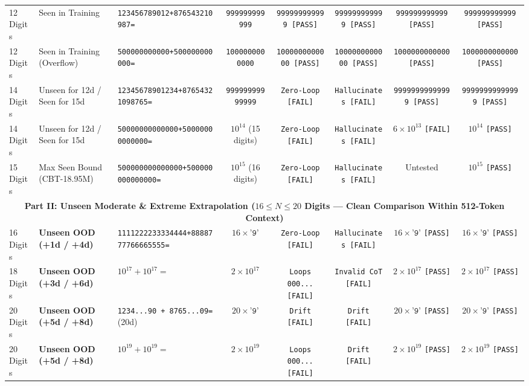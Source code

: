\documentclass[10pt,twocolumn]{article}
\begin{document}
\begin{table}[t]
{\begin{tabular}{@{}lllccccc@{}}
12 Digits & Seen in Training & \texttt{123456789012+876543210987=} & \texttt{999999999999} & \texttt{999999999999 [PASS]} & \texttt{999999999999 [PASS]} & \texttt{999999999999 [PASS]} & \texttt{999999999999 [PASS]} \\
12 Digits & Seen in Training (Overflow) & \texttt{500000000000+500000000000=} & \texttt{1000000000000} & \texttt{1000000000000 [PASS]} & \texttt{1000000000000 [PASS]} & \texttt{1000000000000 [PASS]} & \texttt{1000000000000 [PASS]} \\
14 Digits & Unseen for 12d / Seen for 15d & \texttt{12345678901234+87654321098765=} & \texttt{99999999999999} & \texttt{Zero-Loop [FAIL]} & \texttt{Hallucinates [FAIL]} & \texttt{99999999999999 [PASS]} & \texttt{99999999999999 [PASS]} \\
14 Digits & Unseen for 12d / Seen for 15d & \texttt{50000000000000+50000000000000=} & $10^{14}$ (15 digits) & \texttt{Zero-Loop [FAIL]} & \texttt{Hallucinates [FAIL]} & $6\times 10^{13}$ \texttt{[FAIL]} & $10^{14}$ \texttt{[PASS]} \\
15 Digits & Max Seen Bound (CBT-18.95M) & \texttt{500000000000000+500000000000000=} & $10^{15}$ (16 digits) & \texttt{Zero-Loop [FAIL]} & \texttt{Hallucinates [FAIL]} & Untested & $10^{15}$ \texttt{[PASS]} \\
\midrule
\multicolumn{8}{c}{\textbf{Part II: Unseen Moderate \& Extreme Extrapolation ($16 \le N \le 20$ Digits --- Clean Comparison Within 512-Token Context)}} \\
\midrule
16 Digits & \textbf{Unseen OOD (+1d / +4d)} & \texttt{1111222233334444+8888777766665555=} & $16\times\texttt{'9'}$ & \texttt{Zero-Loop [FAIL]} & \texttt{Hallucinates [FAIL]} & $16\times\texttt{'9'}$ \texttt{[PASS]} & $16\times\texttt{'9'}$ \texttt{[PASS]} \\
18 Digits & \textbf{Unseen OOD (+3d / +6d)} & $10^{17} + 10^{17}=$ & $2\times 10^{17}$ & \texttt{Loops 000... [FAIL]} & \texttt{Invalid CoT [FAIL]} & $2\times 10^{17}$ \texttt{[PASS]} & $2\times 10^{17}$ \texttt{[PASS]} \\
20 Digits & \textbf{Unseen OOD (+5d / +8d)} & \texttt{1234...90 + 8765...09=} (20d) & $20\times\texttt{'9'}$ & \texttt{Drift [FAIL]} & \texttt{Drift [FAIL]} & $20\times\texttt{'9'}$ \texttt{[PASS]} & $20\times\texttt{'9'}$ \texttt{[PASS]} \\
20 Digits & \textbf{Unseen OOD (+5d / +8d)} & $10^{19} + 10^{19}=$ & $2\times 10^{19}$ & \texttt{Loops 000... [FAIL]} & \texttt{Drift [FAIL]} & $2\times 10^{19}$ \texttt{[PASS]} & $2\times 10^{19}$ \texttt{[PASS]} \\

\end{tabular}}
\end{table}
\end{document}

